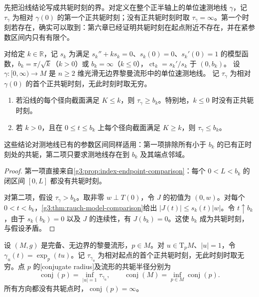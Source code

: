 先把沿线结论写成共轭时刻的界。对定义在整个正半轴上的单位速测地线 \(\gamma\)，记 \(\tau_\gamma\) 为相对 \(\gamma(0)\) 的第一个正共轭时刻；没有正共轭时刻时取 \(\tau_\gamma=\infty\)。第一个时刻若存在，确实可以取到：第六章已经证明共轭时刻在起点附近不存在，并在紧参数区间内只有有限个。

\begin{proposition}\label{g3:prop:conjugate-radius-comparison}
	对给定 \(k\in\mathbb R\)，记 \(s_k\) 为满足 \(s_k''+ks_k=0\)、\(s_k(0)=0\)、\(s_k'(0)=1\) 的模型函数，\(b_k=\pi/\sqrt k\)（\(k>0\)）或 \(b_k=\infty\)（\(k\le0\)），\(\operatorname{ct}_k=s_k'/s_k\) 于 \((0,b_k)\)。
	设 \(\gamma:[0,\infty)\to M\) 是 \(n\ge2\) 维光滑无边界黎曼流形中的单位速测地线。
	记 \(\tau_\gamma\) 为相对 \(\gamma(0)\) 的首个正共轭时刻，无此时刻时取无穷。
	\begin{enumerate}
		\item 若沿线的每个径向截面满足 \(K\le k\)，则 \(\tau_\gamma\ge b_k\)。特别地，\(k\le0\) 时没有正共轭时刻。
		\item 若 \(k>0\)，且在 \(0\le t\le b_k\) 上每个径向截面满足 \(K\ge k\)，则 \(\tau_\gamma\le b_k\)。
	\end{enumerate}
	这些结论对测地线已有的参数区间同样适用：第一项排除所有小于 \(b_k\) 的已有正时刻处的共轭，第二项只要求测地线存在到 \(b_k\) 及其端点邻域。
\end{proposition}
\begin{proof}
	第一项直接来自\cref{g3:prop:index-endpoint-comparison}：每个 \(0<L<b_k\) 的闭区间 \([0,L]\) 都没有共轭时刻。

	对第二项，假设 \(\tau_\gamma>b_k\)。取非零 \(w\perp T(0)\)，令 \(J\) 的初值为 \((0,w)\)。对每个 \(0<t<b_k\)，\cref{g3:thm:rauch-model-comparison}给出 \(|J(t)|\le s_k(t)|w|\)。令 \(t\uparrow b_k\)，由于 \(s_k(b_k)=0\) 以及 \(J\) 的连续性，有 \(J(b_k)=0\)。这使 \(b_k\) 成为共轭时刻，与假设矛盾。
\end{proof}

\begin{definition}[共轭半径]\label{g3:def:conjugate-radius}
	设 \((M,g)\) 是完备、无边界的黎曼流形，\(p\in M\)。对 \(u\in \mathrm{T}_pM\)、\(|u|=1\)，令 \(\gamma_u(t)=\exp_p(tu)\)。记 \(\tau_{\gamma_u}\) 为相对起点的首个正共轭时刻，无此时刻时取无穷。点 \(p\) 的[conjugate radius]及流形的共轭半径分别为
	\[
		\operatorname{conj}(p)=\inf_{|u|=1}\tau_{\gamma_u},
		\qquad \operatorname{conj}(M)=\inf_{p\in M}\operatorname{conj}(p).
	\]
	所有方向都没有共轭点时，\(\operatorname{conj}(p)=\infty\)。
\end{definition}

